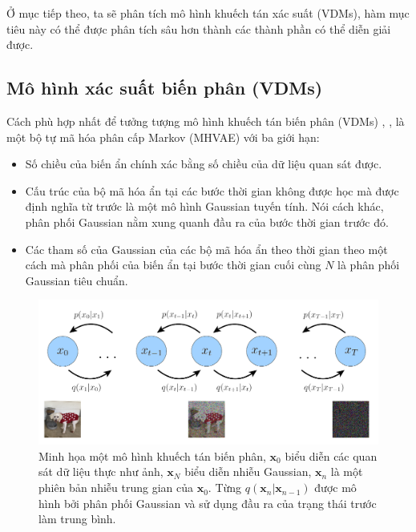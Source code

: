 \documentclass[14pt, a4paper]{article}
\numberwithin{equation}{section}
\numberwithin{figure}{section}
\numberwithin{dl}{section}
\numberwithin{md}{section}
\numberwithin{bd}{section}
\numberwithin{dn}{section}
\numberwithin{hq}{section}
\begin{document}
    Ở mục tiếp theo, ta sẽ phân tích mô hình khuếch tán xác suất (VDMs), hàm mục tiêu này có thể được phân tích sâu hơn thành các thành phần có thể diễn giải được.

    \subsection{Mô hình xác suất biến phân (VDMs)}

    Cách phù hợp nhất để tưởng tượng mô hình khuếch tán biến phân (VDMs) \cite{sohl2015deep}, \cite{ho2020denoising}, \cite{kingma2021variational} là một bộ tự mã hóa phân cấp Markov (MHVAE) với ba giới hạn:

    \begin{itemize}
        \item Số chiều của biến ẩn chính xác bằng số chiều của dữ liệu quan sát được.
        \item Cấu trúc của bộ mã hóa ẩn tại các bước thời gian không được học mà được định nghĩa từ trước là một mô hình Gaussian tuyến tính.
        Nói cách khác, phân phối Gaussian nằm xung quanh đầu ra của bước thời gian trước đó.
        \item Các tham số của Gaussian của các bộ mã hóa ẩn theo thời gian theo một cách mà phân phối của biến ẩn tại bước thời gian cuối cùng $N$ là phân phối Gaussian tiêu chuẩn. 
    \end{itemize}

    \begin{figure}[h!]
        \centering
        \includegraphics[scale=0.6]{VDM-Graph.png}
        \caption{Minh họa một mô hình khuếch tán biến phân, $\boldsymbol{x}_0$ biểu diễn các quan sát dữ liệu thực như ảnh, $\boldsymbol{x}_N$ biểu diễn nhiễu Gaussian, $\boldsymbol{x}_n$ là một phiên bản nhiễu trung gian của $\boldsymbol{x}_0$.
        Từng $q(\boldsymbol{x}_n \vert \boldsymbol{x}_{n-1})$ được mô hình bởi phân phối Gaussian và sử dụng đầu ra của trạng thái trước làm trung bình.}
        \label{fig:VDM-Graph}
    \end{figure}
\end{document}
